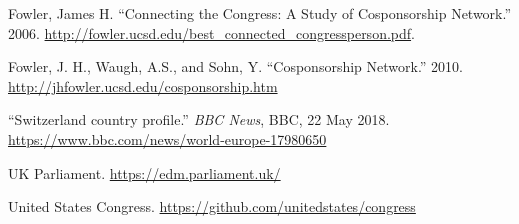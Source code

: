 \documentclass[12pt]{article}
\begin{document}
\begin{multicols*}{2}
\begin{thebibliography}{9}
 Fowler, James H. ``Connecting the Congress: A Study of Cosponsorship Network.'' 2006. \url{http://fowler.ucsd.edu/best_connected_congressperson.pdf}.

 Fowler, J. H., Waugh, A.S., and Sohn, Y. ``Cosponsorship Network.'' 2010. \url {http://jhfowler.ucsd.edu/cosponsorship.htm}

 ``Switzerland country profile.'' \emph{BBC News}, BBC, 22 May 2018. \url{https://www.bbc.com/news/world-europe-17980650}

 UK Parliament. \url{https://edm.parliament.uk/}

 United States Congress. \url{https://github.com/unitedstates/congress}
\end{thebibliography}


\end{multicols*}
\end{document}
